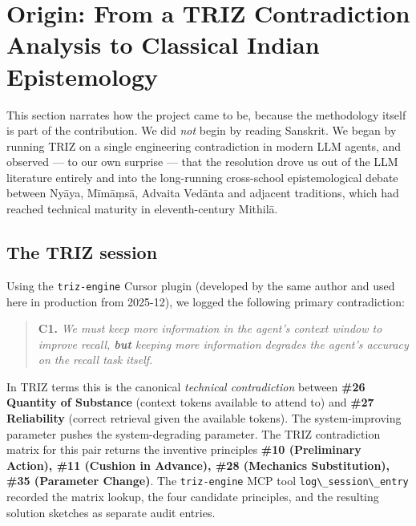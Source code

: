 \section{Origin: From a TRIZ Contradiction Analysis to Classical Indian Epistemology}\label{origin-from-a-triz-contradiction-analysis-to-classical-indian-epistemology}

This section narrates how the project came to be, because the methodology itself is part of the contribution. We did \emph{not} begin by reading Sanskrit. We began by running TRIZ \citep{altshuller1984creativity, altshuller2002innovation, terninko1998triz, savransky2000triz} on a single engineering contradiction in modern LLM agents, and observed --- to our own surprise --- that the resolution drove us out of the LLM literature entirely and into the long-running cross-school epistemological debate between Nyāya, Mīmāṃsā, Advaita Vedānta and adjacent traditions, which had reached technical maturity in eleventh-century Mithilā.

\subsection{The TRIZ session}\label{the-triz-session}

Using the \passthrough{\lstinline!triz-engine!} Cursor plugin \citep{trizengineplugin} (developed by the same author and used here in production from 2025-12), we logged the following primary contradiction:

\begin{quote}
\textbf{C1.} \emph{We must keep more information in the agent's context window to improve recall, \textbf{but} keeping more information degrades the agent's accuracy on the recall task itself.}
\end{quote}

In TRIZ terms this is the canonical \emph{technical contradiction} between \textbf{\#26 Quantity of Substance} (context tokens available to attend to) and \textbf{\#27 Reliability} (correct retrieval given the available tokens). The system-improving parameter pushes the system-degrading parameter. The TRIZ contradiction matrix \citep{altshuller2002innovation} for this pair returns the inventive principles \textbf{\#10 (Preliminary Action), \#11 (Cushion in Advance), \#28 (Mechanics Substitution), \#35 (Parameter Change)}. The \passthrough{\lstinline!triz-engine!} MCP tool \passthrough{\lstinline!log\_session\_entry!} recorded the matrix lookup, the four candidate principles, and the resulting solution sketches as separate audit entries.

